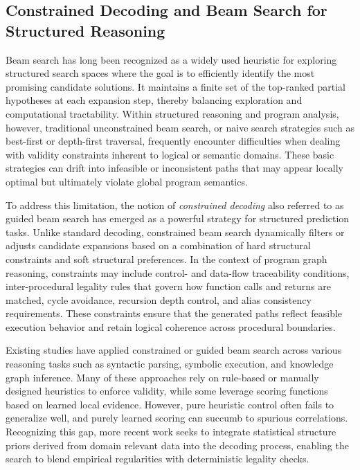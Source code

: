 \documentclass{buthesis}
\begin{document}
\subsection{Constrained Decoding and Beam Search for Structured Reasoning}
\label{sec:rw-constrained-beam}

Beam search has long been recognized as a widely used heuristic for exploring structured search spaces where the goal is to efficiently identify the most promising candidate solutions. It maintains a finite set of the top-ranked partial hypotheses at each expansion step, thereby balancing exploration and computational tractability. Within structured reasoning and program analysis, however, traditional unconstrained beam search, or naive search strategies such as best-first or depth-first traversal, frequently encounter difficulties when dealing with validity constraints inherent to logical or semantic domains. These basic strategies can drift into infeasible or inconsistent paths that may appear locally optimal but ultimately violate global program semantics.

To address this limitation, the notion of \emph{constrained decoding} also referred to as guided beam search has emerged as a powerful strategy for structured prediction tasks. Unlike standard decoding, constrained beam search dynamically filters or adjusts candidate expansions based on a combination of hard structural constraints and soft structural preferences. In the context of program graph reasoning, constraints may include control- and data-flow traceability conditions, inter-procedural legality rules that govern how function calls and returns are matched, cycle avoidance, recursion depth control, and alias consistency requirements. These constraints ensure that the generated paths reflect feasible execution behavior and retain logical coherence across procedural boundaries.

Existing studies have applied constrained or guided beam search across various reasoning tasks such as syntactic parsing, symbolic execution, and knowledge graph inference. Many of these approaches rely on rule-based or manually designed heuristics to enforce validity, while some leverage scoring functions based on learned local evidence. However, pure heuristic control often fails to generalize well, and purely learned scoring can succumb to spurious correlations. Recognizing this gap, more recent work seeks to integrate statistical structure priors derived from domain relevant data into the decoding process, enabling the search to blend empirical regularities with deterministic legality checks.
\end{document}

